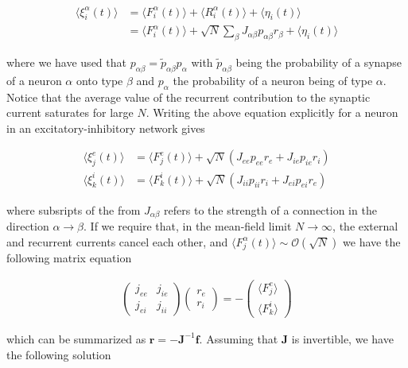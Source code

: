 \documentclass{ucetd}
\begin{document}
\begin{align*}
\langle \xi_{i}^{\alpha}(t)\rangle &= \langle F_{i}^{\alpha}(t)\rangle + \langle R_{i}^{\alpha}(t)\rangle + \langle\eta_{i}(t)\rangle\\
&= \langle F_{i}^{\alpha}(t)\rangle + \sqrt{N}\sum_{\beta}J_{\alpha\beta}p_{\alpha\beta}r_{\beta} + \langle\eta_{i}(t)\rangle
\end{align*}

where we have used that $p_{\alpha\beta} = \tilde{p}_{\alpha\beta}p_{\alpha}$ with $\tilde{p}_{\alpha\beta}$ being the probability of a synapse of a neuron $\alpha$ onto type $\beta$ and $p_{\alpha}$ the probability of a neuron being of type $\alpha$. Notice that the average value of the recurrent contribution to the synaptic current saturates for large $N$. Writing the above equation explicitly for a neuron in an excitatory-inhibitory network gives

\begin{align}
\langle \xi_{j}^{e}(t)\rangle &= \langle F_{j}^{e}(t)\rangle + \sqrt{N}\left(J_{ee}p_{ee}r_{e} + J_{ie}p_{ie}r_{i}\right)\\
\langle \xi_{k}^{i}(t)\rangle &= \langle F_{k}^{i}(t)\rangle + \sqrt{N}\left(J_{ii}p_{ii}r_{i} + J_{ei}p_{ei}r_{e}\right)
\end{align}

where subsripts of the from $J_{\alpha\beta}$ refers to the strength of a connection in the direction $\alpha\rightarrow\beta$. If we require that, in the mean-field limit $N\rightarrow\infty$, the external and recurrent currents cancel each other, and $\langle F_{j}^{\alpha}(t)\rangle \sim \mathcal{O}(\sqrt{N})$ we have the following matrix equation

\begin{align}
\begin{pmatrix}
j_{ee} & j_{ie}\\
j_{ei} & j_{ii}
\end{pmatrix}
\begin{pmatrix}
r_{e}\\
r_{i}
\end{pmatrix}
= 
-\begin{pmatrix}
\langle F_{j}^{e}\rangle\\
\langle F_{k}^{i}\rangle
\end{pmatrix}
\end{align}

which can be summarized as $\mathbf{r} = -\mathbf{J}^{-1}\mathbf{f}$. Assuming that $\mathbf{J}$ is invertible, we have the following solution
\end{document}
